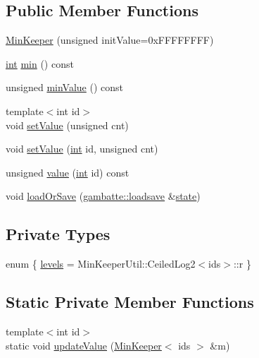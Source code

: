 \subsection*{Public Member Functions}
\begin{DoxyCompactItemize}
\item 
\hyperlink{classMinKeeper_a131eb12143092dbce960174124d60663}{Min\+Keeper} (unsigned init\+Value=0x\+F\+F\+F\+F\+F\+F\+F\+F)
\item 
\hyperlink{ioapi_8h_a787fa3cf048117ba7123753c1e74fcd6}{int} \hyperlink{classMinKeeper_a27b4f4cc206c7e587231929994d26705}{min} () const
\item 
unsigned \hyperlink{classMinKeeper_a92eb88a85193e36452c4b321ed7db903}{min\+Value} () const
\item 
{\footnotesize template$<$int id$>$ }\\void \hyperlink{classMinKeeper_ab74f92c2bfad235b0663a3765a716dab}{set\+Value} (unsigned cnt)
\item 
void \hyperlink{classMinKeeper_a6d2d7fa6634c14d56b1caba0efaec47c}{set\+Value} (\hyperlink{ioapi_8h_a787fa3cf048117ba7123753c1e74fcd6}{int} id, unsigned cnt)
\item 
unsigned \hyperlink{classMinKeeper_a87ea0acfa0a9bdccfacac89794bc30ce}{value} (\hyperlink{ioapi_8h_a787fa3cf048117ba7123753c1e74fcd6}{int} id) const
\item 
void \hyperlink{classMinKeeper_a00b6df8254b050b77b9c1350a0b7d386}{load\+Or\+Save} (\hyperlink{classgambatte_1_1loadsave}{gambatte\+::loadsave} \&\hyperlink{ppu_8cpp_a2f2eca6997ee7baf8901725ae074d45b}{state})
\end{DoxyCompactItemize}
\subsection*{Private Types}
\begin{DoxyCompactItemize}
\item 
enum \{ \hyperlink{classMinKeeper_a745fcad4766af72248c4f26e8fb5b754aea945fa5cad053f00154ef3bf621ea51}{levels} = Min\+Keeper\+Util\+:\+:Ceiled\+Log2$<$ids$>$\+:\+:r
 \}
\end{DoxyCompactItemize}
\subsection*{Static Private Member Functions}
\begin{DoxyCompactItemize}
\item 
{\footnotesize template$<$int id$>$ }\\static void \hyperlink{classMinKeeper_abbe4083eb661d964a091c5e5d6f0a9cf}{update\+Value} (\hyperlink{classMinKeeper}{Min\+Keeper}$<$ ids $>$ \&m)
\end{DoxyCompactItemize}

